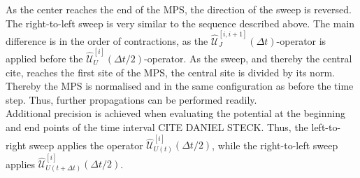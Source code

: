 As the center reaches the end of the MPS, the direction of the sweep is reversed. The right-to-left sweep is very similar to the sequence described above. The main difference is in the order of contractions, as the $\hat{\mathcal{U}}_{J}^{[i,i+1]} (\Delta t)$-operator is applied before the $\hat{\mathcal{U}}_{U}^{[i]} (\Delta t /2)$-operator. As the sweep, and thereby the central cite, reaches the first site of the MPS, the central site is divided by its norm. Thereby the MPS is normalised and in the same configuration as before the time step. Thus, further propagations can be performed readily.\\ 
Additional precision is achieved when evaluating the potential at the beginning and end points of the time interval CITE DANIEL STECK. Thus, the left-to-right sweep applies the operator $\hat{\mathcal{U}}_{U(t)}^{[i]} (\Delta t /2)$, while the right-to-left sweep applies $\hat{\mathcal{U}}_{U(t + \Delta t)}^{[i]} (\Delta t /2)$.


